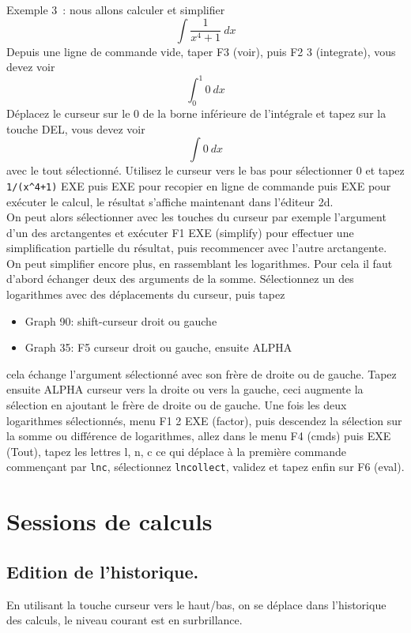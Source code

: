 \documentclass{article}
\begin{document}
\begin{giacjshere}
Exemple 3~: nous allons calculer et simplifier 
$$ \int \frac{1}{x^4+1} \ dx $$
Depuis une ligne de commande vide, taper F3 (voir), puis F2 3 (integrate),
vous devez voir
$$ \int_0^1 0 \ dx$$
D\'eplacez le curseur sur le 0 de la borne inf\'erieure de l'int\'egrale
et tapez sur la touche DEL, vous devez voir
$$ \int 0 \ dx$$
avec le tout s\'electionn\'e. Utilisez le curseur vers le bas
pour s\'electionner 0 et tapez \verb|1/(x^4+1)| EXE puis EXE pour
recopier en ligne de commande puis EXE pour ex\'ecuter le calcul,
le r\'esultat s'affiche maintenant dans l'\'editeur 2d.\\
On peut alors s\'electionner avec les touches du curseur par exemple
l'argument d'un des arctangentes et ex\'ecuter F1 EXE (simplify) 
pour effectuer une simplification partielle du r\'esultat, puis
recommencer avec l'autre arctangente.\\
On peut simplifier encore plus, en rassemblant les logarithmes. Pour
cela il faut d'abord \'echanger deux des arguments de la somme. 
S\'electionnez un des logarithmes avec des d\'eplacements du curseur,
puis tapez
\begin{itemize}
\item Graph 90: shift-curseur droit ou gauche
\item Graph 35: F5 curseur droit ou gauche, ensuite ALPHA
\end{itemize}
cela \'echange l'argument s\'electionn\'e avec son fr\`ere de droite ou
de gauche. Tapez ensuite 
 ALPHA curseur vers la droite ou vers la gauche, ceci augmente la
s\'election en ajoutant le fr\`ere de droite ou de gauche.
Une fois les deux logarithmes s\'electionn\'es, menu F1 2 EXE (factor), puis
descendez la s\'election sur la somme ou diff\'erence de logarithmes,
allez dans le menu F4 (cmds) puis EXE (Tout), tapez les lettres l, n, c
ce qui d\'eplace \`a la premi\`ere commande commen\c{c}ant par \verb|lnc|,
s\'electionnez \verb|lncollect|, validez et tapez enfin sur F6 (eval).

\section{Sessions de calculs}
\subsection{Edition de l'historique.}
En utilisant la touche curseur vers le haut/bas, on se d\'eplace dans
l'historique des calculs, le niveau courant est en surbrillance. 


\end{giacjshere}
\end{document}
